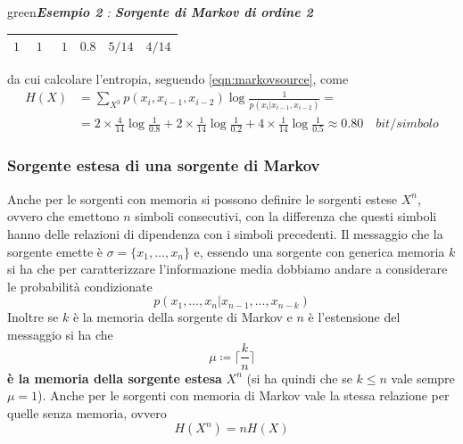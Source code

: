 \begin{mybox}[breakable]{green}{\textit{\textbf{Esempio 2} : \textbf{Sorgente di Markov di ordine 2}}}
\begin{table}[H]
\begin{tabular}{cccc}
    $1\hspace{16pt}1\hspace{18pt}1$ & $0.8$ & $5/14$ & $4/14$ \\
    \bottomrule
    \end{tabular}
\end{table}
da cui calcolare l'entropia, seguendo \ref{eqn:markovsource}, come
\begin{align*}
    H(X) &= \sum_{X^3} p(x_i, x_{i-1}, x_{i-2}) \log \frac{1}{p(x_i|x_{i-1},x_{i-2})} = \\
    &= 2 \times \frac{4}{14} \log \frac{1}{0.8} + 2 \times \frac{1}{14}\log \frac{1}{0.2} + 4 \times \frac{1}{14} \log \frac{1}{0.5} \approx 0.80 \quad bit/simbolo
\end{align*}
\end{mybox}
\subsubsection{Sorgente estesa di una sorgente di Markov}
Anche per le sorgenti con memoria si possono definire le sorgenti estese $X^n$, ovvero che emettono $n$ simboli consecutivi, con la differenza che questi simboli hanno delle relazioni di dipendenza con i simboli precedenti. Il messaggio che la sorgente emette \`e $\sigma = \{x_1, \dots, x_n \}$ e, essendo una sorgente con generica memoria $k$ si ha che per caratterizzare l'informazione media dobbiamo andare a considerare le probabilit\`a condizionate
\begin{equation*}
    p(x_1, \dots, x_n | x_{n-1}, \dots, x_{n-k})
\end{equation*}
Inoltre se $k$ \`e la memoria della sorgente di Markov e $n$ \`e l'estensione del messaggio si ha che 
\begin{equation}
    \mu \coloneqq \bigg \lceil \frac{k}{n} \bigg \rceil
\end{equation}
\textbf{\`e la memoria della sorgente estesa} $X^n$ (si ha quindi che se $k\leq n$ vale sempre $\mu=1$). Anche per le sorgenti con memoria di Markov vale la stessa relazione per quelle senza memoria, ovvero 
\begin{equation}
H(X^n) = n H(X)
\end{equation}
